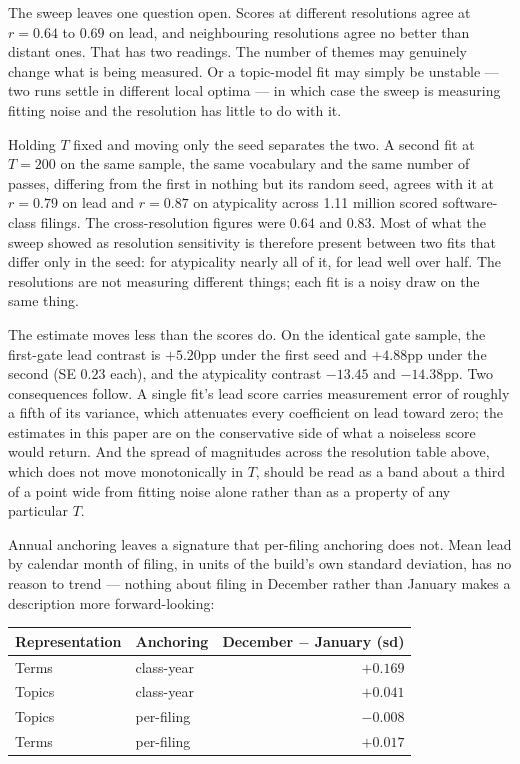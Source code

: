 The sweep leaves one question open. Scores at different resolutions agree at
$r = 0.64$ to $0.69$ on lead, and neighbouring resolutions agree no better than
distant ones. That has two readings. The number of themes may genuinely change
what is being measured. Or a topic-model fit may simply be unstable --- two
runs settle in different local optima --- in which case the sweep is measuring
fitting noise and the resolution has little to do with it.

Holding $T$ fixed and moving only the seed separates the two. A second fit at
$T = 200$ on the same sample, the same vocabulary and the same number of
passes, differing from the first in nothing but its random seed, agrees with
it at $r = 0.79$ on lead and $r = 0.87$ on atypicality across 1.11 million
scored software-class filings. The cross-resolution figures were $0.64$ and
$0.83$. Most of what the sweep showed as resolution sensitivity is therefore
present between two fits that differ only in the seed: for atypicality nearly
all of it, for lead well over half. The resolutions are not measuring
different things; each fit is a noisy draw on the same thing.

The estimate moves less than the scores do. On the identical gate sample, the
first-gate lead contrast is $+5.20$pp under the first seed and $+4.88$pp under
the second (SE $0.23$ each), and the atypicality contrast $-13.45$ and
$-14.38$pp. Two consequences follow. A single fit's lead score carries
measurement error of roughly a fifth of its variance, which attenuates every
coefficient on lead toward zero; the estimates in this paper are on the
conservative side of what a noiseless score would return. And the spread of
magnitudes across the resolution table above, which does not move
monotonically in $T$, should be read as a band about a third of a point wide
from fitting noise alone rather than as a property of any particular $T$.

Annual anchoring leaves a signature that per-filing anchoring does not. Mean
lead by calendar month of filing, in units of the build's own standard
deviation, has no reason to trend --- nothing about filing in December rather
than January makes a description more forward-looking:

\begin{center}\small
\begin{tabular}{llr}
\toprule
Representation & Anchoring & December $-$ January (sd) \\
\midrule
Terms  & class-year & $+0.169$ \\
Topics & class-year & $+0.041$ \\
Topics & per-filing & $-0.008$ \\
Terms  & per-filing & $+0.017$ \\
\bottomrule
\end{tabular}
\end{center}


